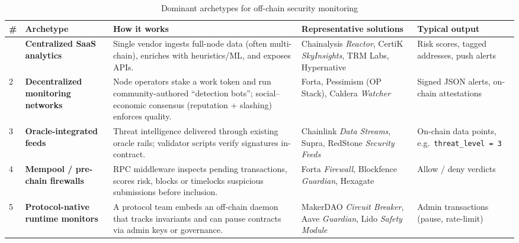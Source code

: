 \documentclass{scrreport}
\begin{document}
\begin{table}[H]
\centering
\caption{Dominant archetypes for off-chain security monitoring}
\begin{tabularx}{\textwidth}{>{\raggedright\arraybackslash}p{0.6cm}%
                          >{\raggedright\arraybackslash}p{2.6cm}%
                          >{\raggedright\arraybackslash}X
                          >{\raggedright\arraybackslash}p{3cm}
                          >{\raggedright\arraybackslash}p{3cm}}
\toprule
\# & Archetype & How it works & Representative solutions & Typical output \\ \midrule
1 & \textbf{Centralized SaaS analytics} &
    Single vendor ingests full-node data (often multi-chain), enriches with heuristics/ML, and exposes
    APIs. &
    Chainalysis \textit{Reactor}, CertiK \textit{SkyInsights}, TRM Labs, Hypernative &
    Risk scores, tagged addresses, push alerts \\ \addlinespace[0.3em]

2 & \textbf{Decentralized monitoring networks} &
    Node operators stake a work token and run community-authored ``detection bots''; social–economic
    consensus (reputation + slashing) enforces quality. &
    Forta, Pessimism (OP Stack), Caldera \textit{Watcher} &
    Signed JSON alerts, on-chain attestations \\ \addlinespace[0.3em]

3 & \textbf{Oracle-integrated feeds} &
    Threat intelligence delivered through existing oracle rails; validator scripts verify signatures
    in-contract. &
    Chainlink \textit{Data Streams}, Supra, RedStone \textit{Security Feeds} &
    On-chain data points, e.g.\ \texttt{threat\_level = 3} \\ \addlinespace[0.3em]

4 & \textbf{Mempool / pre-chain firewalls} &
    RPC middleware inspects pending transactions, scores risk, blocks or timelocks suspicious submissions
    before inclusion. &
    Forta \textit{Firewall}, Blockfence \textit{Guardian}, Hexagate &
    Allow / deny verdicts \\ \addlinespace[0.3em]

5 & \textbf{Protocol-native runtime monitors} &
    A protocol team embeds an off-chain daemon that tracks invariants and can pause contracts via admin
    keys or governance. &
    MakerDAO \textit{Circuit Breaker}, Aave \textit{Guardian}, Lido \textit{Safety Module} &
    Admin transactions (pause, rate-limit) \\ \bottomrule
\end{tabularx}
\end{table}
\end{document}

